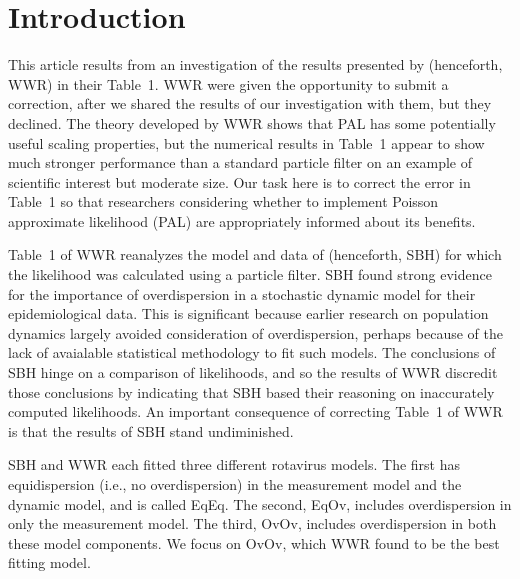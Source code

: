 \documentclass[10pt]{article}\usepackage[]{graphicx}\usepackage[]{xcolor}
\begin{document}














\section{Introduction}

This article results from an investigation of the results presented by \citet{wwr} (henceforth, WWR) in their Table~1.
WWR were given the opportunity to submit a correction, after we shared the results of our investigation with them, but they declined.
The theory developed by WWR shows that PAL has some potentially useful scaling properties, but the numerical results in Table~1 appear to show much stronger performance than a standard particle filter on an example of scientific interest but moderate size.
Our task here is to correct the error in Table~1 so that researchers considering whether to implement Poisson approximate likelihood (PAL) are appropriately informed about its benefits.

Table~1 of WWR reanalyzes the model and data of \citet{stocks} (henceforth, SBH) for which the likelihood was calculated using a particle filter.
SBH found strong evidence for the importance of overdispersion in a stochastic dynamic model for their epidemiological data.
This is significant because earlier research on population dynamics largely avoided consideration of overdispersion, perhaps because of the lack of avaialable statistical methodology to fit such models. 
The conclusions of SBH hinge on a comparison of likelihoods, and so the results of WWR discredit those conclusions by indicating that SBH based their reasoning on inaccurately computed likelihoods.
An important consequence of correcting Table~1 of WWR is that the results of SBH stand undiminished. 

SBH and WWR each fitted three different rotavirus models.
The first has equidispersion (i.e., no overdispersion) in the measurement model and the dynamic model, and is called EqEq.
The second, EqOv, includes overdispersion in only the measurement model.
The third, OvOv, includes overdispersion in both these model components.
We focus on OvOv, which WWR found to be the best fitting model. 
\end{document}
